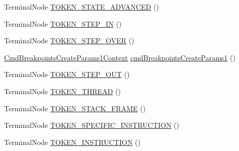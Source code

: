 \begin{DoxyCompactItemize}
\item 
Terminal\+Node \hyperlink{classgov_1_1nasa_1_1jpf_1_1inspector_1_1server_1_1expression_1_1parser_1_1_expression_grammar_paee196826319d0ea00470866a7ffd8d7b_a9dacfe781c6ea34fa92254dd9806ad7f}{T\+O\+K\+E\+N\+\_\+\+S\+T\+A\+T\+E\+\_\+\+A\+D\+V\+A\+N\+C\+ED} ()
\item 
Terminal\+Node \hyperlink{classgov_1_1nasa_1_1jpf_1_1inspector_1_1server_1_1expression_1_1parser_1_1_expression_grammar_paee196826319d0ea00470866a7ffd8d7b_a01ad062638fe4f56fcede94a67f0b600}{T\+O\+K\+E\+N\+\_\+\+S\+T\+E\+P\+\_\+\+IN} ()
\item 
Terminal\+Node \hyperlink{classgov_1_1nasa_1_1jpf_1_1inspector_1_1server_1_1expression_1_1parser_1_1_expression_grammar_paee196826319d0ea00470866a7ffd8d7b_af70c96004df95592a9f23afbaeda0e60}{T\+O\+K\+E\+N\+\_\+\+S\+T\+E\+P\+\_\+\+O\+V\+ER} ()
\item 
\hyperlink{classgov_1_1nasa_1_1jpf_1_1inspector_1_1server_1_1expression_1_1parser_1_1_expression_grammar_pa96543943a9acc7eb3cd37320a4fc3ee4}{Cmd\+Breakpoints\+Create\+Params1\+Context} \hyperlink{classgov_1_1nasa_1_1jpf_1_1inspector_1_1server_1_1expression_1_1parser_1_1_expression_grammar_paee196826319d0ea00470866a7ffd8d7b_aac4c8c968f8c3334a3aefb63ec608da7}{cmd\+Breakpoints\+Create\+Params1} ()
\item 
Terminal\+Node \hyperlink{classgov_1_1nasa_1_1jpf_1_1inspector_1_1server_1_1expression_1_1parser_1_1_expression_grammar_paee196826319d0ea00470866a7ffd8d7b_a00ba2dbfdbda6afb6723aa44a74102da}{T\+O\+K\+E\+N\+\_\+\+S\+T\+E\+P\+\_\+\+O\+UT} ()
\item 
Terminal\+Node \hyperlink{classgov_1_1nasa_1_1jpf_1_1inspector_1_1server_1_1expression_1_1parser_1_1_expression_grammar_paee196826319d0ea00470866a7ffd8d7b_a3984dc59a47aed60b07dd8160c744eaf}{T\+O\+K\+E\+N\+\_\+\+T\+H\+R\+E\+AD} ()
\item 
Terminal\+Node \hyperlink{classgov_1_1nasa_1_1jpf_1_1inspector_1_1server_1_1expression_1_1parser_1_1_expression_grammar_paee196826319d0ea00470866a7ffd8d7b_aad53bdd3b5efdcee154bfb375e9644a2}{T\+O\+K\+E\+N\+\_\+\+S\+T\+A\+C\+K\+\_\+\+F\+R\+A\+ME} ()
\item 
Terminal\+Node \hyperlink{classgov_1_1nasa_1_1jpf_1_1inspector_1_1server_1_1expression_1_1parser_1_1_expression_grammar_paee196826319d0ea00470866a7ffd8d7b_aaf492435dbc9c28f8c498bf895d0d7e2}{T\+O\+K\+E\+N\+\_\+\+S\+P\+E\+C\+I\+F\+I\+C\+\_\+\+I\+N\+S\+T\+R\+U\+C\+T\+I\+ON} ()
\item 
Terminal\+Node \hyperlink{classgov_1_1nasa_1_1jpf_1_1inspector_1_1server_1_1expression_1_1parser_1_1_expression_grammar_paee196826319d0ea00470866a7ffd8d7b_a936d3aefbb9aac7012033cb6869aa136}{T\+O\+K\+E\+N\+\_\+\+I\+N\+S\+T\+R\+U\+C\+T\+I\+ON} ()

\end{DoxyCompactItemize}
